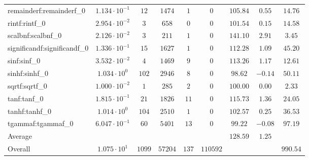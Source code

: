 \begin{tabular}{|l|c|c|c|c|c|c|c|c|}
remainderf:remainderf\_0     & $ 1.134 \cdot 10^{-1} $ & $ 12     $ & $ 1474  $ & $ 1   $ & $ 0      $ & $ 105.84      $ & $ 0.55    $ & $ 14.76   $ \\
rintf:rintf\_0               & $ 2.954 \cdot 10^{-2} $ & $ 3      $ & $ 658   $ & $ 0   $ & $ 0      $ & $ 101.54      $ & $ 0.15    $ & $ 14.58   $ \\
scalbnf:scalbnf\_0           & $ 2.126 \cdot 10^{-2} $ & $ 3      $ & $ 211   $ & $ 1   $ & $ 0      $ & $ 141.10      $ & $ 2.91    $ & $ 3.45    $ \\
significandf:significandf\_0 & $ 1.336 \cdot 10^{-1} $ & $ 15     $ & $ 1627  $ & $ 1   $ & $ 0      $ & $ 112.28      $ & $ 1.09    $ & $ 45.20   $ \\
sinf:sinf\_0                 & $ 3.532 \cdot 10^{-2} $ & $ 4      $ & $ 1469  $ & $ 9   $ & $ 0      $ & $ 113.26      $ & $ 1.17    $ & $ 12.61   $ \\
sinhf:sinhf\_0               & $ 1.034 \cdot 10^{0}  $ & $ 102    $ & $ 2946  $ & $ 8   $ & $ 0      $ & $ 98.62       $ & $ -0.14   $ & $ 50.11   $ \\
sqrtf:sqrtf\_0               & $ 1.000 \cdot 10^{-2} $ & $ 1      $ & $ 285   $ & $ 2   $ & $ 0      $ & $ 100.00      $ & $ 0.00    $ & $ 2.33    $ \\
tanf:tanf\_0                 & $ 1.815 \cdot 10^{-1} $ & $ 21     $ & $ 1826  $ & $ 11  $ & $ 0      $ & $ 115.73      $ & $ 1.36    $ & $ 24.05   $ \\
tanhf:tanhf\_0               & $ 1.014 \cdot 10^{0}  $ & $ 104    $ & $ 2510  $ & $ 1   $ & $ 0      $ & $ 102.57      $ & $ 0.25    $ & $ 36.53   $ \\
tgammaf:tgammaf\_0           & $ 6.047 \cdot 10^{-1} $ & $ 60     $ & $ 5401  $ & $ 13  $ & $ 0      $ & $ 99.22       $ & $ -0.08   $ & $ 97.19   $ \\
\hline
Average                      & $                     $ & $        $ & $       $ & $     $ & $        $ & $ 128.59      $ & $ 1.25    $ & $         $ \\
\hline
Overall                      & $ 1.075 \cdot 10^{1}  $ & $ 1099   $ & $ 57204 $ & $ 137 $ & $ 110592 $ & $             $ & $         $ & $ 990.54  $ \\
\hline
\end{tabular}
